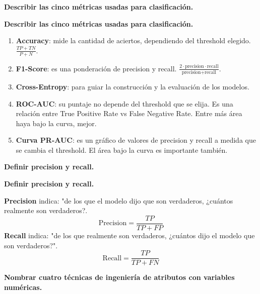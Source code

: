 \documentclass[10pt]{memoir}
\begin{document}
\clearpage
\begin{center}
	\textbf{\Large Describir las cinco métricas usadas para clasificación.} \\
\end{center}

\clearpage
\begin{center}
	\textbf{\Large Describir las cinco métricas usadas para clasificación.} \\
\end{center}
\begin{enumerate}
	\item \textbf{Accuracy}: mide la cantidad de aciertos, dependiendo del threshold elegido. \(\frac{TP+TN}{P+N}\).
	\item \textbf{F1-Score}: es una ponderación de precision y recall. \(\frac{2 \cdot \text{precision} \cdot \text{recall}}{\text{precision} + \text{recall}}\).
	\item \textbf{Cross-Entropy}: para guiar la construcción y la evaluación de los modelos.
	\item \textbf{ROC-AUC}: su puntaje no depende del threshold que se elija. Es una relación entre True Positive Rate vs False Negative Rate. Entre más área haya bajo la curva, mejor.
	\item \textbf{Curva PR-AUC}: es un gráfico de valores de precision y recall a medida que se cambia el threshold. El área bajo la curva es importante también.
\end{enumerate}

\clearpage
\begin{center}
	\textbf{\Large Definir precision y recall.} \\
\end{center}

\clearpage
\begin{center}
	\textbf{\Large Definir precision y recall.} \\
\end{center}
\noindent \textbf{Precision} indica: "de los que el modelo dijo que son verdaderos, ¿cuántos realmente son verdaderos?. \[\text{Precision} = \frac{TP}{TP+FP}\]
\noindent \textbf{Recall} indica: "de los que realmente son verdaderos, ¿cuántos dijo el modelo que son verdaderos?". \[\text{Recall} = \frac{TP}{TP+FN}\]

\clearpage
\begin{center}
	\textbf{\Large Nombrar cuatro técnicas de ingeniería de atributos con variables numéricas.} \\
\end{center}
\end{document}

